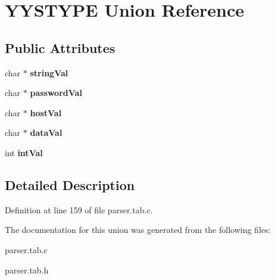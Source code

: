 \hypertarget{unionYYSTYPE}{\section{Y\-Y\-S\-T\-Y\-P\-E Union Reference}
\label{unionYYSTYPE}
}
\subsection*{Public Attributes}
\begin{DoxyCompactItemize}
\item 
\hypertarget{unionYYSTYPE_a0c315585d7890f581e02d4d575d9555f}{char $\ast$ {\bfseries string\-Val}}\label{unionYYSTYPE_a0c315585d7890f581e02d4d575d9555f}

\item 
\hypertarget{unionYYSTYPE_ab5083d55ff29c4a4d195c0bb68bde96a}{char $\ast$ {\bfseries password\-Val}}\label{unionYYSTYPE_ab5083d55ff29c4a4d195c0bb68bde96a}

\item 
\hypertarget{unionYYSTYPE_a196aab8e4b46fbd713850600e39444dd}{char $\ast$ {\bfseries host\-Val}}\label{unionYYSTYPE_a196aab8e4b46fbd713850600e39444dd}

\item 
\hypertarget{unionYYSTYPE_abf6841531dea0790b855d1f6fe1d3d15}{char $\ast$ {\bfseries data\-Val}}\label{unionYYSTYPE_abf6841531dea0790b855d1f6fe1d3d15}

\item 
\hypertarget{unionYYSTYPE_a83ee412e29e20041c84ddb8ffa14b10c}{int {\bfseries int\-Val}}\label{unionYYSTYPE_a83ee412e29e20041c84ddb8ffa14b10c}

\end{DoxyCompactItemize}


\subsection{Detailed Description}


Definition at line 159 of file parser.\-tab.\-c.



The documentation for this union was generated from the following files\-:\begin{DoxyCompactItemize}
\item 
parser.\-tab.\-c\item 
parser.\-tab.\-h\end{DoxyCompactItemize}
